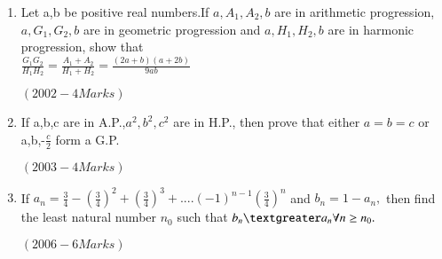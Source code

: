 \documentclass[journal,12pt,twocolumn]{IEEEtran}
\theoremstyle{remark}
\begin{document}
\begin{enumerate}
       \item Let a,b be positive real numbers.If $ a,A_1,A_2,b $ are in arithmetic progression,$ a,G_1,G_2,b $ are in geometric progression and $ a,H_1,H_2,b $ are in harmonic progression, show that \\ 
	       $ \frac{G_1G_2}{H_1H_2}=\frac{A_1+A_2}{H_1+H_2}=\frac{(2a+b)(a+2b)}{9ab} $
        \begin{flushright}                           $(2002 -4 Marks)$                             \end{flushright}
     
	\item If a,b,c are in A.P.,$a^2,b^2,c^2 $ are in H.P., then prove that either $ a=b=c $ or a,b,-$\frac{c}{2}$ form a G.P.
		\begin{flushright}                             $(2003 -4 Marks)$                             \end{flushright}

		\item If $ a_n=\frac{3}{4}-(\frac{3}{4})^2+(\frac{3}{4})^3+....(-1)^{n-1}(\frac{3}{4})^n $ and $ b_n=1-a_n, $ then find the least natural number $n_0$ such that $ b_n \textgreater a_n \forall n \geq n_0. $
		\begin{flushright}                            $(2006 -6 Marks)$                              \end{flushright}
 \end{enumerate} 
\end{document}
